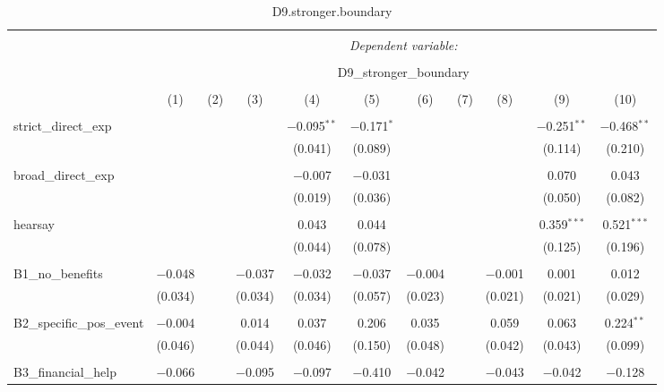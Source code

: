 
\begin{table}[H] \centering 
  \caption{D9.stronger.boundary} 
  \label{} 
\tiny 
\begin{tabular}{@{\extracolsep{4pt}}lcccccccccc} 
\\[-1.8ex]\hline 
\hline \\[-1.8ex] 
 & \multicolumn{10}{c}{\textit{Dependent variable:}} \\ 
\cline{2-11} 
\\[-1.8ex] & \multicolumn{10}{c}{D9\_stronger\_boundary} \\ 
\\[-1.8ex] & (1) & (2) & (3) & (4) & (5) & (6) & (7) & (8) & (9) & (10)\\ 
\hline \\[-1.8ex] 
 strict\_direct\_exp &  &  &  & $-$0.095$^{**}$ & $-$0.171$^{*}$ &  &  &  & $-$0.251$^{**}$ & $-$0.468$^{**}$ \\ 
  &  &  &  & (0.041) & (0.089) &  &  &  & (0.114) & (0.210) \\ 
  & & & & & & & & & & \\ 
 broad\_direct\_exp &  &  &  & $-$0.007 & $-$0.031 &  &  &  & 0.070 & 0.043 \\ 
  &  &  &  & (0.019) & (0.036) &  &  &  & (0.050) & (0.082) \\ 
  & & & & & & & & & & \\ 
 hearsay &  &  &  & 0.043 & 0.044 &  &  &  & 0.359$^{***}$ & 0.521$^{***}$ \\ 
  &  &  &  & (0.044) & (0.078) &  &  &  & (0.125) & (0.196) \\ 
  & & & & & & & & & & \\ 
 B1\_no\_benefits & $-$0.048 &  & $-$0.037 & $-$0.032 & $-$0.037 & $-$0.004 &  & $-$0.001 & 0.001 & 0.012 \\ 
  & (0.034) &  & (0.034) & (0.034) & (0.057) & (0.023) &  & (0.021) & (0.021) & (0.029) \\ 
  & & & & & & & & & & \\ 
 B2\_specific\_pos\_event & $-$0.004 &  & 0.014 & 0.037 & 0.206 & 0.035 &  & 0.059 & 0.063 & 0.224$^{**}$ \\ 
  & (0.046) &  & (0.044) & (0.046) & (0.150) & (0.048) &  & (0.042) & (0.043) & (0.099) \\ 
  & & & & & & & & & & \\ 
 B3\_financial\_help & $-$0.066 &  & $-$0.095 & $-$0.097 & $-$0.410 & $-$0.042 &  & $-$0.043 & $-$0.042 & $-$0.128 \\ 

\end{tabular}
\end{table}
